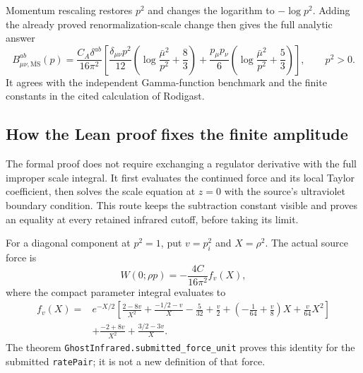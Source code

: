 \documentclass[11pt]{article}
\newcommand{\MS}{\overline{\mathrm{MS}}}
\newcommand{\code}[1]{{\small\nolinkurl{#1}}}
\begin{document}
Momentum rescaling restores $p^2$ and changes the logarithm to
$-\log p^2$. Adding the already proved renormalization-scale change
then gives the full analytic answer
\begin{equation}\label{eq:finite-ghost-answer}
 B^{ab}_{\mu\nu,\MS}(p)=\frac{C_A\delta^{ab}}{16\pi^2}
 \left[
 \frac{\delta_{\mu\nu}p^2}{12}
       \left(\log\frac{\bar\mu^2}{p^2}+\frac83\right)
 +\frac{p_\mu p_\nu}{6}
       \left(\log\frac{\bar\mu^2}{p^2}+\frac53\right)
 \right],\qquad p^2>0.
\end{equation}
It agrees with the independent Gamma-function benchmark and the
finite constants in the cited calculation of Rodigast.

\subsection{How the Lean proof fixes the finite amplitude}
\label{sec:finite-proof}

The formal proof does not require exchanging a regulator derivative
with the full improper scale integral. It first evaluates the continued
force and its local Taylor coefficient, then solves the scale equation
at $z=0$ with the source's ultraviolet boundary condition. This route
keeps the subtraction constant visible and proves an equality at every
retained infrared cutoff, before taking its limit.

For a diagonal component at $p^2=1$, put $v=p_i^2$ and $X=\rho^2$.
The actual source force is
\[
 W(0;\rho p)=-\frac{4C}{16\pi^2} f_v(X),
\]
where the compact parameter integral evaluates to
\begin{align*}
 f_v(X)={}&e^{-X/2}\left[
 \frac{2-8v}{X^2}+\frac{-1/2-v}{X}-\frac5{32}+\frac v2
 +\left(-\frac1{64}+\frac v8\right)X+\frac v{64}X^2\right]\\
 &+\frac{-2+8v}{X^2}+\frac{3/2-3v}{X}.
\end{align*}
The theorem \code{GhostInfrared.submitted_force_unit} proves this
identity for the submitted \code{ratePair}; it is not a new definition
of that force.
\end{document}
